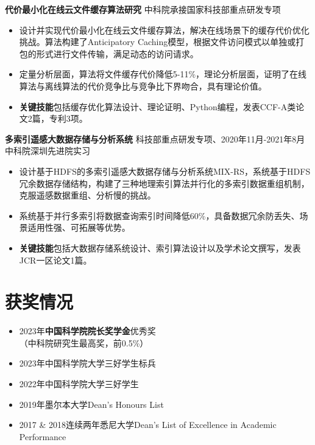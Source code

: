 \documentclass[UTF8,letterpaper,11pt]{article}
\begin{document}
\vspace{1pt}

\textbf{代价最小化在线云文件缓存算法研究} \hfill 中科院承接国家科技部重点研发专项

\begin{itemize}
  \setlength\itemsep{1.8pt}
  \item 设计并实现代价最小化在线云文件缓存算法，解决在线场景下的缓存代价优化挑战。算法构建了Anticipatory Caching模型，根据文件访问模式以单独或打包的形式进行文件传输，满足动态的访问请求。
  \item 定量分析层面，算法将文件缓存代价降低5-11\%，理论分析层面，证明了在线算法与离线算法的代价竞争比与竞争比下界吻合，具有理论价值。
  \item \textbf{关键技能}包括缓存优化算法设计、理论证明、Python编程，发表CCF-A类论文2篇，专利3项。
\end{itemize}

\vspace{1pt}

\textbf{多索引遥感大数据存储与分析系统} \hfill 科技部重点研发专项、2020年11月-2021年8月中科院深圳先进院实习

\begin{itemize}
  \setlength\itemsep{1.8pt}
  \item 设计基于HDFS的多索引遥感大数据存储与分析系统MIX-RS，系统基于HDFS冗余数据存储结构，构建了三种地理索引算法并行化的多索引数据重组机制，克服遥感数据重组、分析慢的挑战。
  \item 系统基于并行多索引将数据查询索引时间降低60\%，具备数据冗余防丢失、场景适用性强、可拓展等优势。
  \item \textbf{关键技能}包括大数据存储系统设计、索引算法设计以及学术论文撰写，发表JCR一区论文1篇。
\end{itemize}




\section{\textbf{获奖情况}}
\vspace{-5mm}
\begin{multicols}{2}
\begin{itemize}
  \setlength\itemsep{1.8pt}
  \item 2023年\textbf{中国科学院院长奖学金}优秀奖\\（中科院研究生最高奖，前0.5\%）
  \item 2023年中国科学院大学三好学生标兵
  \item 2022年中国科学院大学三好学生
  \item 2019年墨尔本大学Dean's Honours List
  \item 2017 \& 2018连续两年悉尼大学Dean's List of Excellence in Academic Performance
\end{itemize}
\end{multicols}
\end{document}

